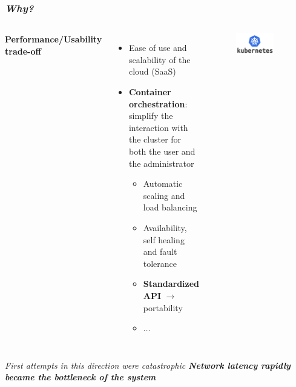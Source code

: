 \begin{frame}
  \frametitle{ \textit{Why?}}
  \begin{columns}
      \textbf{Performance/Usability trade-off}
     \begin{itemize}
       \itemsep0em
       \item \alert{Ease of use} and \alert{scalability} of the cloud (SaaS)
       \item \alert{\textbf{Container orchestration}}: simplify the interaction
         with the cluster for both the user and the administrator
       \begin{itemize}
         \itemsep0em
         \item Automatic scaling and load balancing
         \item Availability, self healing and fault tolerance
         \item \alert{\textbf{Standardized API}} $\to$ portability
         \item $\dots$
       \end{itemize}
     \end{itemize}
     \begin{figure}
       \centering
       \includegraphics[width=0.75\textwidth]{img/logos/kubernetes-logo}
    \end{figure}
  \end{columns}
   \vfill
   \pause
  \begin{block}{ \textit{First attempts in this
        direction were catastrophic}}
    \centering
    \large
    \textbf{\textit{
         Network latency rapidly became the bottleneck
        of the system
        }}
  \end{block}
\end{frame}

